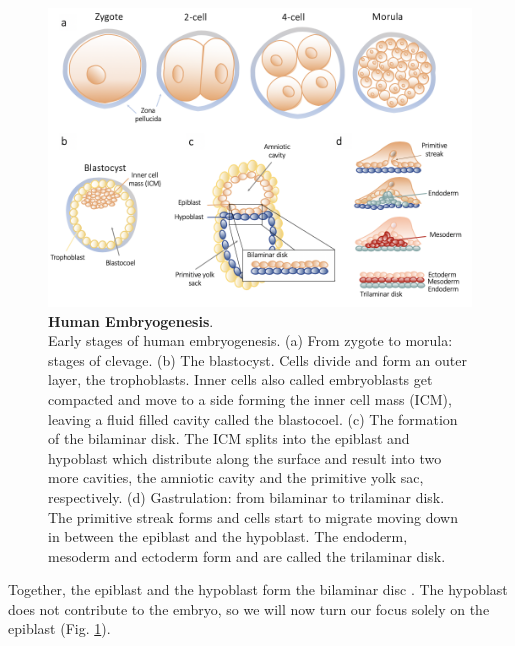 \begin{figure}[h]
\centering
\includegraphics[width=14.5cm]{Chapter1/Fig/embryogenesis_til_gastrulation.png}
\caption[Human Embryogenesis]{\textbf{Human Embryogenesis}.\\
Early stages of human embryogenesis.
(a) From zygote to morula: stages of clevage.
(b) The blastocyst.
Cells divide and form an outer layer, the trophoblasts.
Inner cells also called embryoblasts get compacted and move to a side forming the inner cell mass (ICM), leaving a fluid filled cavity called the blastocoel.
(c) The formation of the bilaminar disk.
The ICM splits into the epiblast and hypoblast which distribute along the surface and result into two more cavities, the amniotic cavity and the primitive yolk sac, respectively.
(d) Gastrulation: from bilaminar to trilaminar disk.
The primitive streak forms and cells start to migrate moving down in between the epiblast and the hypoblast.
The endoderm, mesoderm and ectoderm form and are called the trilaminar disk.}
\label{fig:embryogenesis}
\end{figure}

Together, the epiblast and the hypoblast form the bilaminar disc \cite{hertig1956description}.
The hypoblast does not contribute to the embryo, so we will now turn our focus solely on the epiblast (Fig. \ref{fig:embryogenesis}).\\

